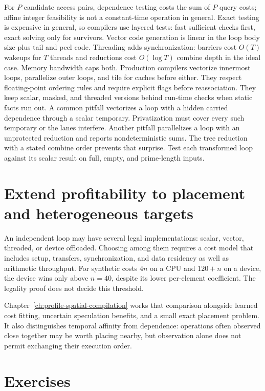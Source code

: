 For $P$ candidate access pairs, dependence testing costs the sum of $P$ query costs; affine integer feasibility is not a constant-time operation in general.
Exact testing is expensive in general, so compilers use layered tests: fast sufficient checks first, exact solving only for survivors.
Vector code generation is linear in the loop body size plus tail and peel code.
Threading adds synchronization: barriers cost $O(T)$ wakeups for $T$ threads and reductions cost $O(\log T)$ combine depth in the ideal case.
Memory bandwidth caps both.
Production compilers vectorize innermost loops, parallelize outer loops, and tile for caches before either.
They respect floating-point ordering rules and require explicit flags before reassociation.
They keep scalar, masked, and threaded versions behind run-time checks when static facts run out.
A common pitfall vectorizes a loop with a hidden carried dependence through a scalar temporary.
Privatization must cover every such temporary or the lanes interfere.
Another pitfall parallelizes a loop with an unprotected reduction and reports nondeterministic sums.
The tree reduction with a stated combine order prevents that surprise.
Test each transformed loop against its scalar result on full, empty, and prime-length inputs.

\section{Extend profitability to placement and heterogeneous targets}
\label{sec:ch36-placement-link}

An independent loop may have several legal implementations: scalar, vector, threaded, or device offloaded.
Choosing among them requires a cost model that includes setup, transfers, synchronization, and data residency as well as arithmetic throughput.
For synthetic costs $4n$ on a CPU and $120+n$ on a device, the device wins only above $n=40$, despite its lower per-element coefficient.
The legality proof does not decide this threshold.

Chapter~\ref{ch:profile-spatial-compilation} works that comparison alongside learned cost fitting, uncertain speculation benefits, and a small exact placement problem.
It also distinguishes temporal affinity from dependence: operations often observed close together may be worth placing nearby, but observation alone does not permit exchanging their execution order.

\section{Exercises}\label{sec:ch36-exercises}

